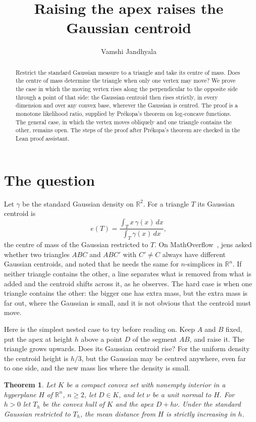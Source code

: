 \documentclass[11pt]{article}
\title{Raising the apex raises the Gaussian centroid}
\author{Vamshi Jandhyala}
\date{}
\newtheorem{theorem}{Theorem}
\theoremstyle{remark}
\begin{document}
\maketitle
\vspace{-2em}

\begin{abstract}
Restrict the standard Gaussian measure to a triangle and take its centre of mass. Does the centre of mass
determine the triangle when only one vertex may move? We prove the case in which the moving vertex rises
along the perpendicular to the opposite side through a point of that side: the Gaussian centroid then rises
strictly, in every dimension and over any convex base, wherever the Gaussian is centred. The proof is a
monotone likelihood ratio, supplied by Pr\'ekopa's theorem on log-concave functions. The general case, in which
the vertex moves obliquely and one triangle contains the other, remains open. The steps of the proof after
Pr\'ekopa's theorem are checked in the Lean proof assistant.
\end{abstract}

\section{The question}

Let $\gamma$ be the standard Gaussian density on $\mathbb R^2$. For a triangle $T$ its Gaussian centroid is
\[
e(T)=\frac{\int_T x\,\gamma(x)\,dx}{\int_T\gamma(x)\,dx},
\]
the centre of mass of the Gaussian restricted to $T$. On MathOverflow~\cite{MO}, jens asked whether two
triangles $ABC$ and $ABC'$ with $C'\ne C$ always have different Gaussian centroids, and noted that he needs the
same for $n$-simplices in $\mathbb R^n$. If neither triangle contains the other, a line separates what is
removed from what is added and the centroid shifts across it, as he observes. The hard case is when one
triangle contains the other: the bigger one has extra mass, but the extra mass is far out, where the Gaussian
is small, and it is not obvious that the centroid must move.

Here is the simplest nested case to try before reading on. Keep $A$ and $B$ fixed, put the apex at height $h$
above a point $D$ of the segment $AB$, and raise it. The triangle grows upwards. Does its Gaussian centroid
rise? For the uniform density the centroid height is $h/3$, but the Gaussian may be centred anywhere, even far
to one side, and the new mass lies where the density is small.

\begin{theorem}\label{thm:main}
Let $K$ be a compact convex set with nonempty interior in a hyperplane $H$ of $\mathbb R^n$, $n\ge2$, let
$D\in K$, and let $\nu$ be a unit normal to $H$. For $h>0$ let $T_h$ be the convex hull of $K$ and the apex
$D+h\nu$. Under the standard Gaussian restricted to $T_h$, the mean distance from $H$ is strictly increasing
in $h$.
\end{theorem}
\end{document}
